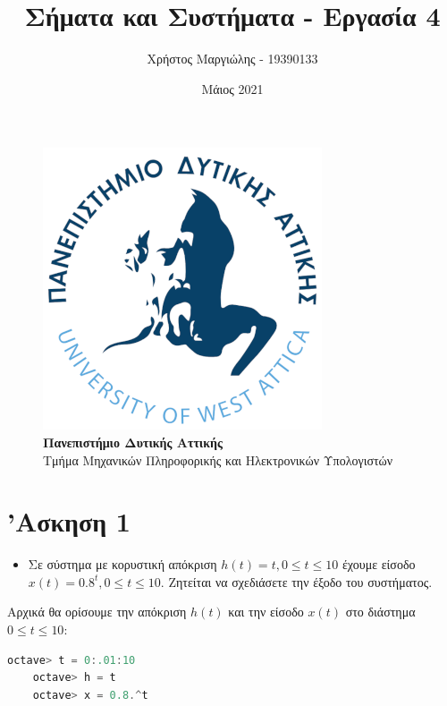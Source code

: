 \documentclass{article}
\title{Σήματα και Συστήματα - Εργασία 4}
\author{Χρήστος Μαργιώλης - 19390133}
\date{Μάιος 2021}
\begin{document}
\begin{titlepage}
        \maketitle
        \begin{figure}[t!]
        \begin{center}
        \includegraphics[scale=0.3]{./res/uniwalogo.png} \\
        \Large
        \textbf{Πανεπιστήμιο Δυτικής Αττικής} \\
        \large
        Τμήμα Μηχανικών Πληροφορικής και Ηλεκτρονικών Υπολογιστών
        \end{center}
        \end{figure}
\end{titlepage}

\renewcommand{\contentsname}{Περιεχόμενα}
\tableofcontents

\section{'Ασκηση 1}

\begin{itemize}
	\item Σε σύστημα με κορυστική απόκριση $h(t) = t, 0 \leq t \leq 10$
		έχουμε είσοδο $x(t) = 0.8^t, 0 \leq t \leq 10$. Ζητείται να
		σχεδιάσετε την έξοδο του συστήματος.
\end{itemize}

Αρχικά θα ορίσουμε την απόκριση $h(t)$ και την είσοδο $x(t)$ στο διάστημα
$0 \leq t \leq 10$:

\begin{lstlisting}[language=octave]
	octave> t = 0:.01:10
	octave> h = t
	octave> x = 0.8.^t
\end{lstlisting}
\end{document}
